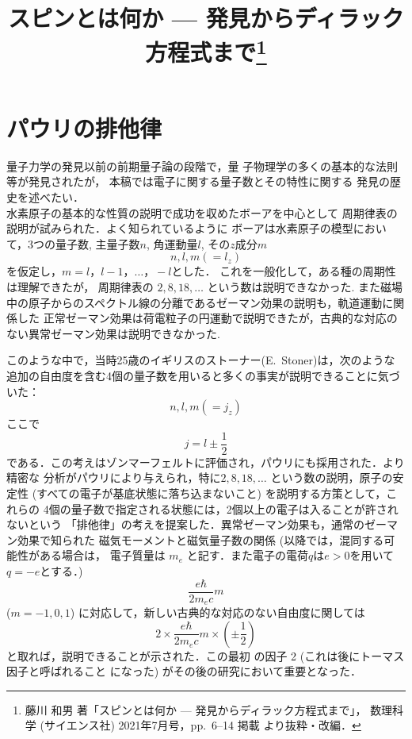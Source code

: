 \documentclass{jsarticle}
\begin{document}
\title{スピンとは何か --- 発見からディラック方程式まで\thanks{%
    藤川 和男 著「スピンとは何か --- 発見からディラック方程式まで」，
    数理科学 (サイエンス社) 2021年7月号，pp.~6--14 掲載
    より抜粋・改編．}}
\author{} %
\date{}   %

\maketitle

\section{パウリの排他律}
\label{sec:pauliexclusion}


量子力学の発見以前の前期量子論の段階で，量
子物理学の多くの基本的な法則等が発見されたが，
本稿では電子に関する量子数とその特性に関する
発見の歴史を述べたい．\\
水素原子の基本的な性質の説明で成功を収めたボーアを中心として
周期律表の説明が試みられた．よく知られているように
ボーアは水素原子の模型において，3つの量子数,
主量子数$n$, 角運動量$l$, その$z$成分$m$
\[
  n, l, m (=l_z)
\]
を仮定し，$m=l，l-1，\ldots，-l$とした．
これを一般化して，ある種の周期性は理解できたが，
周期律表の $2,8,18,\ldots$ という数は説明できなかった.
また磁場中の原子からのスペクトル線の分離であるゼーマン効果の説明も，軌道運動に関係した
正常ゼーマン効果は荷電粒子の円運動で説明できたが，古典的な対応のない異常ゼーマン効果は説明できなかった.

このような中で，当時25歳のイギリスのストーナー(E.\ Stoner)は，次のような
追加の自由度を含む4個の量子数を用いると多くの事実が説明できることに気づいた：
\[
  n, l, m (=j_z)
\]
ここで
\[
  j = l\pm \frac{1}{2}
\]
である．この考えはゾンマーフェルトに評価され，パウリにも採用された．より精密な
分析がパウリにより与えられ，特に$2,8,18,\ldots$ という数の説明，原子の安定性
(すべての電子が基底状態に落ち込まないこと) を説明する方策として，これらの
4個の量子数で指定される状態には，2個以上の電子は入ることが許されないという
「排他律」の考えを提案した．異常ゼーマン効果も，通常のゼーマン効果で知られた
磁気モーメントと磁気量子数の関係 
(以降では，混同する可能性がある場合は，
電子質量は $m_e$ と記す．また電子の電荷$q$は$e>0$を用いて$q=-e$とする．) 
\[
    \frac{e\hbar}{2m_{e} c} m 
\]
($m=-1,0,1$) に対応して，新しい古典的な対応のない自由度に関しては
\[
    2\times \frac{e\hbar}{2m_{e} c} m \times \left(\pm\frac{1}{2}\right)
\]
と取れば，説明できることが示された．この最初
の因子 2 (これは後にトーマス因子と呼ばれること
になった) がその後の研究において重要となった．
\end{document}
